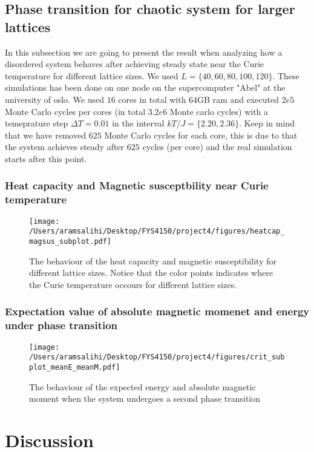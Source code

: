 \documentclass[a4paper, 10pt]{article}
\begin{document}
\subsection{Phase transition for chaotic system for larger lattices}
In this subsection we are going to present the result when analyzing how a disordered system behaves after achieving
steady state near the Curie temperature for different lattice sizes. We used $L = \{40,60,80,100,120\}$. These simulations has been done on one node on the supercomputer "Abel" at the university of oslo.
We used $16$ cores in total with 64GB ram and executed $2e5$ Monte Carlo cycles per cores (in total $3.2e6$ Monte carlo cycles)
with a temeprature step $\Delta T = 0.01$ in the interval $kT/J = \{2.20,2.36\}$. Keep in mind that we have removed $625$ Monte Carlo cycles for each core,
this is due to that the system achieves steady after $625$ cycles (per core) and the real simulation starts after this point.
\subsubsection{Heat capacity and Magnetic susceptbility near Curie temperature}
\begin{figure}[H]
  \texttt{[image: /Users/aramsalihi/Desktop/FYS4150/project4/figures/heatcap\_magsus\_subplot.pdf]}
  \centering
  \caption{The behaviour of the heat capacity and magnetic susceptibility for different lattice sizes. Notice that the
  color points indicates where the Curie temperature occours for different lattice sizes.}
  \label{heatcap magsus}
\end{figure}
\subsubsection{Expectation value of absolute magnetic momenet and energy under phase transition}
\begin{figure}[H]
  \texttt{[image: /Users/aramsalihi/Desktop/FYS4150/project4/figures/crit\_subplot\_meanE\_meanM.pdf]}
  \centering
  \caption{The behaviour of the expected energy and absolute magnetic moment when the system undergoes a second phase transition}
  \label{meanE fabsM Tc}
\end{figure}
\section{Discussion}
\end{document}
